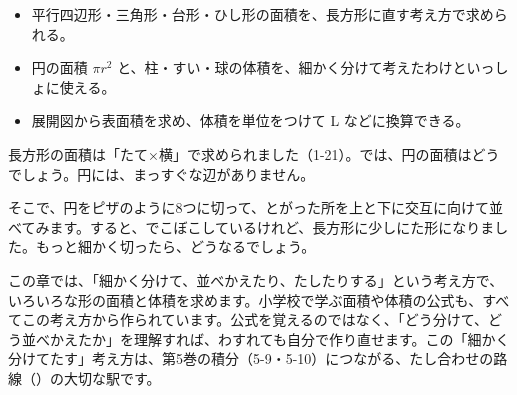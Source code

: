 \begin{goal}
\begin{itemize}[label={\color{\bkTT}●}, leftmargin=1.6\zw, itemsep=0pt, topsep=1pt]
\item {}\enspace 平行四辺形・三角形・台形・ひし形の面積を、長方形に直す考え方で求められる。
\item {}\enspace 円の面積 $\pi r^2$ と、柱・すい・球の体積を、細かく分けて考えたわけといっしょに使える。
\item {}\enspace 展開図から表面積を求め、体積を単位をつけて L などに換算できる。
\end{itemize}
\end{goal}

\begin{hatena}
長方形の面積は「たて×横」で求められました（1-21）。では、円の面積はどうでしょう。円には、まっすぐな辺がありません。

そこで、円をピザのように8つに切って、とがった所を上と下に交互に向けて並べてみます。すると、でこぼこしているけれど、長方形に少しにた形になりました。もっと細かく切ったら、どうなるでしょう。
\begin{bkfigure}
\end{bkfigure}
\end{hatena}

\noindent この章では、「細かく分けて、並べかえたり、たしたりする」という考え方で、いろいろな形の面積と体積を求めます。小学校で学ぶ面積や体積の公式も、すべてこの考え方から作られています。公式を覚えるのではなく、「どう分けて、どう並べかえたか」を理解すれば、わすれても自分で作り直せます。この「細かく分けてたす」考え方は、第5巻の積分（5-9・5-10）につながる、たし合わせの路線（）の大切な駅です。

\begin{omoidasou}
\end{omoidasou}

